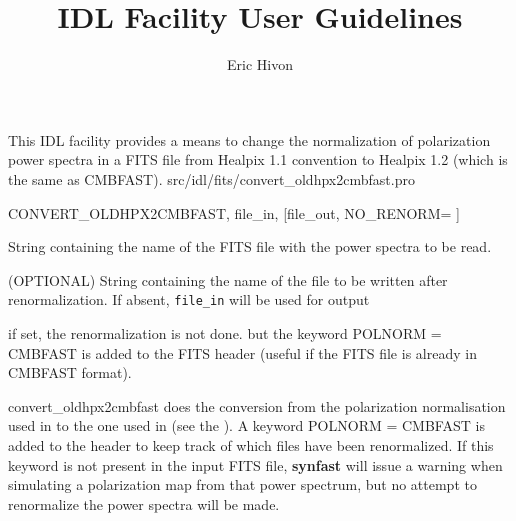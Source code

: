 



\sloppy



\title{\healpix IDL Facility User Guidelines}
 \section[convert\_oldhpx2cmbfast]{ }
\label{idl:convert_oldhpx2cmbfast}
\author{Eric Hivon}




\begin{facility}
{This IDL facility provides a means to
change the normalization of polarization power spectra in a FITS file
from Healpix 1.1 convention to Healpix 1.2 (which is the same as CMBFAST).
}
{src/idl/fits/convert\_oldhpx2cmbfast.pro}
\end{facility}

\begin{IDLformat}
{CONVERT\_OLDHPX2CMBFAST, file\_in, [file\_out, NO\_RENORM= ]}
\end{IDLformat}

\begin{qualifiers}
  \begin{qulist}{} %
    \item[file\_in] String containing the name of the FITS file with the power
    spectra to be read.
    \item[file\_out] (OPTIONAL) String containing the name of the file to be
    written after renormalization. If absent, {\tt file\_in} will be used for output
  \end{qulist}
\end{qualifiers}

\begin{keywords}
  \begin{kwlist}{} %
    \item[NO\_RENORM =] if set, the renormalization is not done.
      but the keyword POLNORM = CMBFAST is added to the FITS header
   (useful if the FITS file is already in CMBFAST format).
  \end{kwlist}
\end{keywords}  

\begin{codedescription}
{convert\_oldhpx2cmbfast does the conversion from the polarization normalisation
used in  to the one used in  
(see the 
).
A keyword POLNORM = CMBFAST is added to the header to keep track of which
files have been renormalized.  If this keyword is not present in the input FITS
file, \textbf{synfast} will issue a
warning when simulating a polarization map from that power spectrum, but no
attempt to renormalize the power spectra will be made. 
}
\end{codedescription}



